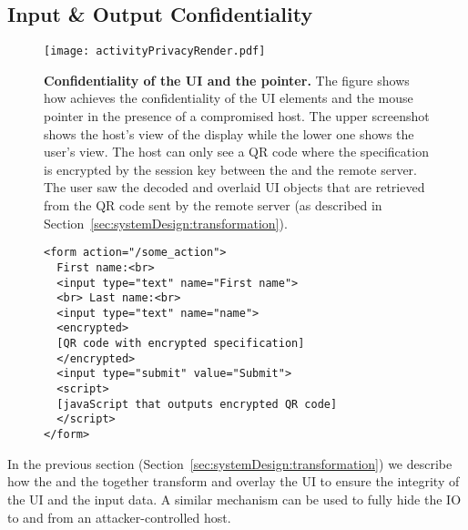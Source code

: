 \iffalse
\begin{figure}[h]
\centering
\texttt{[image: inputPrivacy.pdf]}
\caption{Input Confidentiality}
\label{fig:inputPrivacy}
\centering
\end{figure}
\fi




\subsection{Input \& Output Confidentiality}
\label{sec:systemDesign:mousePrivacy}


\begin{figure}[t]
\centering
\texttt{[image: activityPrivacyRender.pdf]}
\caption{\textbf{Confidentiality of the UI and the pointer.} The figure shows how \name achieves the confidentiality of the UI elements and the mouse pointer in the presence of a compromised host. The upper screenshot shows the host's view of the display while the lower one shows the user's view. The host can only see a QR code where the specification is encrypted by the \tls session key between the \device and the remote server. The user saw the decoded and overlaid UI objects that are retrieved from the QR code sent by the remote server (as described in Section~\ref{sec:systemDesign:transformation}).}
\label{fig:activityPrivacy}
\centering
\end{figure}


\begin{figure}[t]
\small
\begin{lstlisting}[mathescape=true]
<form action="/some_action">
  First name:<br>
  <input type="text" name="First name">
  <br> Last name:<br>
  <input type="text" name="name">
  <encrypted>
  [QR code with encrypted specification]
  </encrypted>
  <input type="submit" value="Submit">
  <script>
  [javaScript that outputs encrypted QR code]
  </script>
</form> 
\end{lstlisting} 
\end{figure}

In the previous section (Section~\ref{sec:systemDesign:transformation}) we describe how the \name \js and the \device together transform and overlay the UI to ensure the integrity of the UI and the input data. A similar mechanism can be used to fully hide the IO to and from an attacker-controlled host. 

